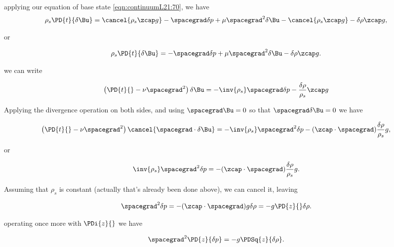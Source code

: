 applying our equation of base state \ref{eqn:continuumL21:70}, we have
\begin{equation}\label{eqn:continuumL21:110b}
\rho_s \PD{t}{\delta \Bu} = \cancel{\rho_s \zcap g} - \spacegrad \delta p + \mu \spacegrad^2 \delta \Bu - \cancel{\rho_s \zcap g} - \delta \rho \zcap g,
\end{equation}

or

\begin{equation}\label{eqn:continuumL21:110c}
\rho_s \PD{t}{\delta \Bu} = - \spacegrad \delta p + \mu \spacegrad^2 \delta \Bu - \delta \rho \zcap g.
\end{equation}

we can write

\begin{equation}\label{eqn:continuumL21:130}
\left( \PD{t}{} - \nu \spacegrad^2 \right) \delta \Bu = -\inv{\rho_s} \spacegrad \delta p - \frac{\delta \rho}{\rho_s} \zcap g
\end{equation}

Applying the divergence operation on both sides, and using $\spacegrad \Bu = 0$ so that $\spacegrad \delta \Bu = 0$ we have

\begin{equation}\label{eqn:continuumL21:150}
\left( \PD{t}{} - \nu \spacegrad^2 \right) \cancel{\spacegrad \cdot \delta \Bu} = -\inv{\rho_s} \spacegrad^2 \delta p - (\zcap \cdot \spacegrad ) \frac{\delta \rho}{\rho_s} g,
\end{equation}

or

\begin{equation}\label{eqn:continuumL21:170}
\inv{\rho_s} \spacegrad^2 \delta p = - (\zcap \cdot \spacegrad ) \frac{\delta \rho}{\rho_s} g.
\end{equation}

Assuming that $\rho_s$ is constant (actually that's already been done above), we can cancel it, leaving

\begin{equation}\label{eqn:continuumL21:190}
\spacegrad^2 \delta p = - (\zcap \cdot \spacegrad ) g \delta \rho = -g \PD{z}{} \delta \rho.
\end{equation}

operating once more with $\PDi{z}{}$ we have

\begin{equation}\label{eqn:continuumL21:210}
\spacegrad^2 \PD{z}{\delta p} = -g \PDSq{z}{\delta \rho}.
\end{equation}

